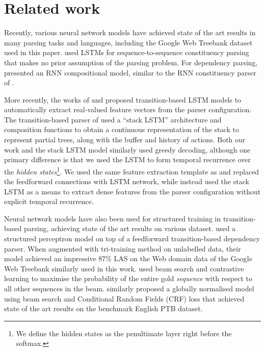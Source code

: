\section{Related work} Recently, various neural network models have achieved state of the art results in many parsing tasks and languages, including the Google Web Treebank dataset used in this paper.  used LSTMs for sequence-to-sequence constituency parsing that makes no prior assumption of the parsing problem. For dependency parsing,  presented an RNN compositional model, similar to the RNN constituency parser of . 

More recently, the works of  and  proposed transition-based LSTM models to automatically extract real-valued feature vectors from the parser configuration. The transition-based parser of  used a ``stack LSTM'' architecture and composition functions to obtain a continuous representation of the stack to represent partial trees, along with the buffer and history of actions. Both our work and the stack LSTM model similarly used greedy decoding, although one primary difference is that we used the LSTM to form temporal recurrence over the \emph{hidden states}\footnote{We define the hidden states as the penultimate layer right before the softmax.}. We used the same feature extraction template as  and replaced the feedforward connections with LSTM network, while  instead used the stack LSTM as a means to extract dense features from the parser configuration without explicit temporal recurrence.%

Neural network models have also been used for structured training in transition-based parsing, achieving state of the art results on various dataset.  used a structured perceptron model on top of a feedforward transition-based dependency parser. When augmented with tri-training method on unlabelled data, their model achieved an impressive 87\% LAS on the Web domain data of the Google Web Treebank similarly used in this work.  used beam search and contrastive learning to maximise the probability of the entire gold \emph{sequence} with respect to all other sequences in the beam.  similarly proposed a globally normalised model using beam search and Conditional Random Fields (CRF) loss \cite{Let01} that achieved state of the art results on the benchmark English PTB dataset. 

